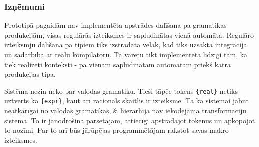 
\subsubsection{Izņēmumi}
Prototipā pagaidām nav implementēta apstrādes dalīšana pa gramatikas produkcijām, visas regulārās izteiksmes ir sapludinātas vienā automāta. Regulāro izteiksmju dalīšana pa tipiem tiks izstrādāta vēlāk, kad tiks uzsākta integrācija un sadarbība ar reālu kompilatoru. Tā varētu tikt implementēta līdzīgi tam, kā tiek realizēti konteksti - pa vienam sapludinātam automātam priekš katra produkcijas tipa.

Sistēma nezin neko par valodas gramatiku. Tieši tāpēc tokens \verb|{real}| netiks uztverts ka \verb|{expr}|, kaut arī racionāls skaitlis ir izteiksme. Tā kā sistēmai jābūt neatkarīgai no valodas gramatikas, šī hierarhija nav iekodējama transformāciju sistēmā. To ir jānodrošina parsētājam, attiecīgi apstrādājot tokenus un apkopojot to nozīmi. Par to arī būs jārūpējas programmētājam rakstot savas makro izteiksmes.
